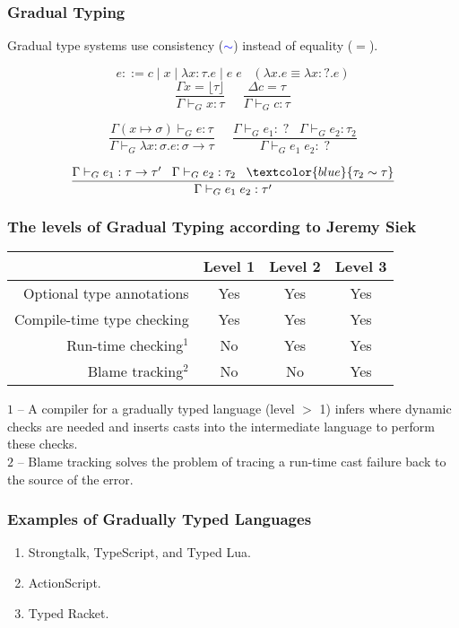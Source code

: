 \documentclass{beamer}
\begin{document}
\begin{frame}
\frametitle{Gradual Typing}
Gradual type systems use consistency (\textcolor{blue}{$\sim$}) instead of equality ($=$).
\begin{Large}
\[
e ::= c \;|\; x \;|\; \lambda x:\tau.e \;|\; e\;e \;\;\;
(\lambda x.e \equiv \lambda x:?.e)
\]
\[
\frac{\Gamma x = \lfloor\tau\rfloor}
     {\Gamma \vdash_{G} x:\tau} \;\;\;\;\;
\frac{\Delta c = \tau}
     {\Gamma \vdash_{G} c:\tau}
\]

\[
\frac{\Gamma(x \mapsto \sigma) \vdash_{G} e:\tau}
     {\Gamma \vdash_{G} \lambda x:\sigma.e:\sigma \rightarrow \tau} \;\;\;\;\;
\frac{\Gamma \vdash_{G} e_{1}:\;? \;\;\; \Gamma \vdash_{G} e_{2}:\tau_{2}}
     {\Gamma \vdash_{G} e_{1}\;e_{2}:\;?}
\]

\[
\frac{\Gamma \vdash_{G} e_{1}:\tau \rightarrow \tau' \;\;\;
      \Gamma \vdash_{G} e_{2}:\tau_{2} \;\;\; \textcolor{blue}{\tau_{2} \sim \tau}}
     {\Gamma \vdash_{G} e_{1}\;e_{2}:\tau'}
\]
\end{Large}
\end{frame}

\begin{frame}
\frametitle{The levels of Gradual Typing according to Jeremy Siek}
\begin{center}
\begin{tabular}{|r|c|c|c|}
\hline
& Level 1 & Level 2 & Level 3\\
\hline
Optional type annotations & Yes & Yes & Yes \\ 
\hline
Compile-time type checking & Yes & Yes & Yes \\
\hline
Run-time checking$^{1}$ & No & Yes & Yes \\
\hline
Blame tracking$^{2}$ & No & No & Yes\\
\hline
\end{tabular}
\end{center}
$1$ -- A compiler for a gradually typed language (level $>$ 1) infers
where dynamic checks are needed and inserts casts into the intermediate
language to perform these checks.\\
$2$ -- Blame tracking solves the problem of tracing a run-time cast
failure back to the source of the error.
\end{frame}

\begin{frame}
\frametitle{Examples of Gradually Typed Languages}
\begin{enumerate}
\item Strongtalk, TypeScript, and Typed Lua.
\item ActionScript.
\item Typed Racket.
\end{enumerate}
\end{frame}
\end{document}
